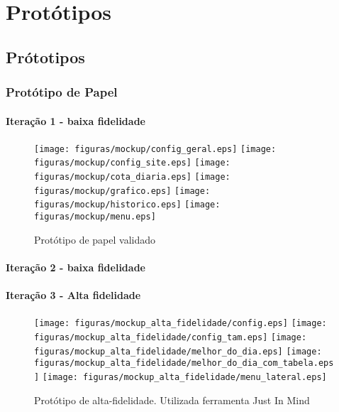 \part[Protótipos]{Protótipos}

\chapter[Prótotipos]{Prótotipos}

\section[Protótipo de Papel]{Protótipo de Papel}
	\subsection{Iteração 1 - baixa fidelidade}

		\begin{figure}[h]
			\centering
			\label{fig03}
				\texttt{[image: figuras/mockup/config\_geral.eps]}
				\texttt{[image: figuras/mockup/config\_site.eps]}
				\texttt{[image: figuras/mockup/cota\_diaria.eps]}
				\texttt{[image: figuras/mockup/grafico.eps]}
				\texttt{[image: figuras/mockup/historico.eps]}
				\texttt{[image: figuras/mockup/menu.eps]}
			\caption{Protótipo de papel validado}
		\end{figure}

	\subsection{Iteração 2 - baixa fidelidade}


	\subsection{Iteração 3 - Alta fidelidade}

		\begin{figure}[h]
			\centering
			\label{fig03}
				\texttt{[image: figuras/mockup\_alta\_fidelidade/config.eps]}
				\texttt{[image: figuras/mockup\_alta\_fidelidade/config\_tam.eps]}
				\texttt{[image: figuras/mockup\_alta\_fidelidade/melhor\_do\_dia.eps]}
				\texttt{[image: figuras/mockup\_alta\_fidelidade/melhor\_do\_dia\_com\_tabela.eps]}
				\texttt{[image: figuras/mockup\_alta\_fidelidade/menu\_lateral.eps]}
			\caption{Protótipo de alta-fidelidade. Utilizada ferramenta Just In Mind}
		\end{figure}

